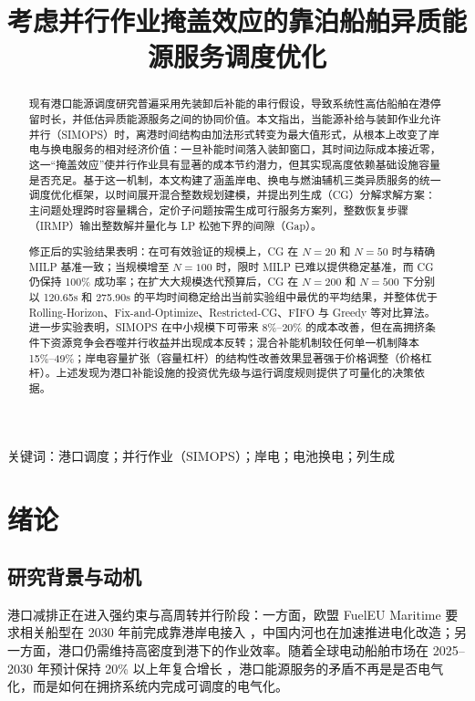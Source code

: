 \documentclass[UTF8, a4paper, 12pt]{ctexart}
\theoremstyle{plain}
\theoremstyle{definition}
\theoremstyle{remark}
\begin{document}
\title{\heiti{} 考虑并行作业掩盖效应的靠泊船舶异质能源服务调度优化}
\author{}
\date{}
\maketitle

\begin{abstract}
现有港口能源调度研究普遍采用先装卸后补能的串行假设，导致系统性高估船舶在港停留时长，并低估异质能源服务之间的协同价值。本文指出，当能源补给与装卸作业允许并行（SIMOPS）时，离港时间结构由加法形式转变为最大值形式，从根本上改变了岸电与换电服务的相对经济价值：一旦补能时间落入装卸窗口，其时间边际成本接近零，这一“掩盖效应”使并行作业具有显著的成本节约潜力，但其实现高度依赖基础设施容量是否充足。基于这一机制，本文构建了涵盖岸电、换电与燃油辅机三类异质服务的统一调度优化框架，以时间展开混合整数规划建模，并提出列生成（CG）分解求解方案：主问题处理跨时容量耦合，定价子问题按需生成可行服务方案列，整数恢复步骤（IRMP）输出整数解并量化与 LP 松弛下界的间隙（Gap）。

修正后的实验结果表明：在可有效验证的规模上，CG 在 $N=20$ 和 $N=50$ 时与精确 MILP 基准一致；当规模增至 $N=100$ 时，限时 MILP 已难以提供稳定基准，而 CG 仍保持 100\% 成功率；在扩大大规模迭代预算后，CG 在 $N=200$ 和 $N=500$ 下分别以 120.65s 和 275.90s 的平均时间稳定给出当前实验组中最优的平均结果，并整体优于 Rolling-Horizon、Fix-and-Optimize、Restricted-CG、FIFO 与 Greedy 等对比算法。进一步实验表明，SIMOPS 在中小规模下可带来 8\%--20\% 的成本改善，但在高拥挤条件下资源竞争会吞噬并行收益并出现成本反转；混合补能机制较任何单一机制降本 15\%--49\%；岸电容量扩张（容量杠杆）的结构性改善效果显著强于价格调整（价格杠杆）。上述发现为港口补能设施的投资优先级与运行调度规则提供了可量化的决策依据。
\end{abstract}

\noindent 关键词：港口调度；并行作业（SIMOPS）；岸电；电池换电；列生成

\section{绪论}
\label{sec:intro}

\subsection{研究背景与动机}
港口减排正在进入强约束与高周转并行阶段：一方面，欧盟 FuelEU Maritime 要求相关船型在 2030 年前完成靠港岸电接入 \citep{EU2025}，中国内河也在加速推进电化改造；另一方面，港口仍需维持高密度到港下的作业效率。随着全球电动船舶市场在 2025--2030 年预计保持 20\% 以上年复合增长 \citep{Markets2025}，港口能源服务的矛盾不再是是否电气化，而是如何在拥挤系统内完成可调度的电气化。
 
\end{document}
